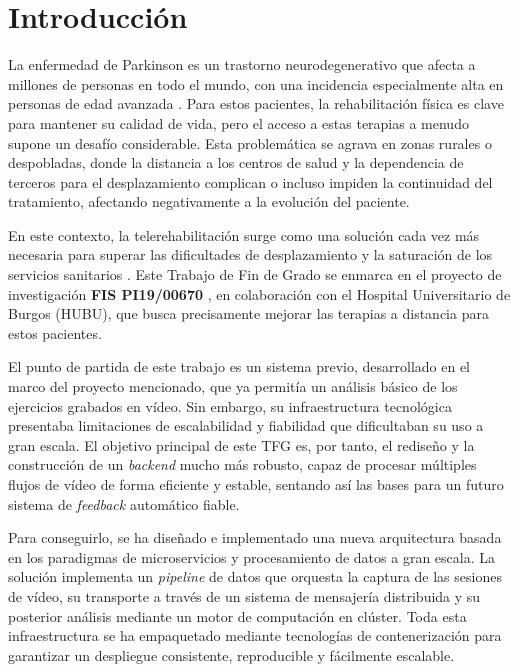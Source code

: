 \chapter{Introducción}
\label{chap:introduccion}

La enfermedad de Parkinson es un trastorno neurodegenerativo que afecta a millones de personas en todo el mundo, con una incidencia especialmente alta en personas de edad avanzada \cite{fuente_parkinson_epidemiologia}. Para estos pacientes, la rehabilitación física es clave para mantener su calidad de vida, pero el acceso a estas terapias a menudo supone un desafío considerable. Esta problemática se agrava en zonas rurales o despobladas, donde la distancia a los centros de salud y la dependencia de terceros para el desplazamiento complican o incluso impiden la continuidad del tratamiento, afectando negativamente a la evolución del paciente.

En este contexto, la telerehabilitación surge como una solución cada vez más necesaria para superar las dificultades de desplazamiento y la saturación de los servicios sanitarios \cite{cottrell2017telerehabilitation}. Este Trabajo de Fin de Grado se enmarca en el proyecto de investigación \textbf{FIS PI19/00670} \cite {garrido_fisfbis}, en colaboración con el Hospital Universitario de Burgos (HUBU), que busca precisamente mejorar las terapias a distancia para estos pacientes.

El punto de partida de este trabajo es un sistema previo, desarrollado en el marco del proyecto mencionado, que ya permitía un análisis básico de los ejercicios grabados en vídeo. Sin embargo, su infraestructura tecnológica presentaba limitaciones de escalabilidad y fiabilidad que dificultaban su uso a gran escala. El objetivo principal de este TFG es, por tanto, el rediseño y la construcción de un \textit{backend} mucho más robusto, capaz de procesar múltiples flujos de vídeo de forma eficiente y estable, sentando así las bases para un futuro sistema de \textit{feedback} automático fiable.

Para conseguirlo, se ha diseñado e implementado una nueva arquitectura basada en los paradigmas de microservicios y procesamiento de datos a gran escala. La solución implementa un \textit{pipeline} de datos que orquesta la captura de las sesiones de vídeo, su transporte a través de un sistema de mensajería distribuida y su posterior análisis mediante un motor de computación en clúster. Toda esta infraestructura se ha empaquetado mediante tecnologías de contenerización para garantizar un despliegue consistente, reproducible y fácilmente escalable.

